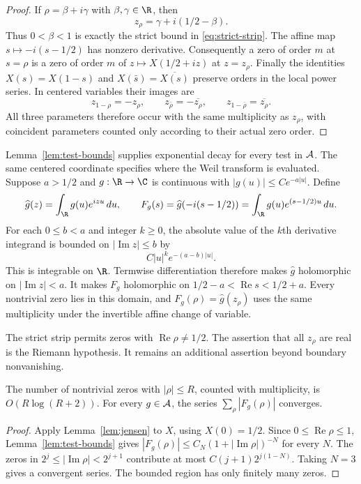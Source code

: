 \begin{proof}
If $\rho=\beta+i\gamma$ with $\beta,\gamma\in\R$, then
\[
 z_\rho=\gamma+i(1/2-\beta).
\]
Thus $0<\beta<1$ is exactly the strict bound in
\eqref{eq:strict-strip}.
The affine map $s\mapsto-i(s-1/2)$ has nonzero derivative.
Consequently a zero of order $m$ at $s=\rho$ is a zero of order $m$
of $z\mapsto X(1/2+iz)$ at $z=z_\rho$.
Finally the identities $X(s)=X(1-s)$ and
$X(\bar s)=\overline{X(s)}$ preserve orders in the local power series.
In centered variables their images are
\[
 z_{1-\rho}=-z_\rho,\qquad
 z_{\bar\rho}=-\overline{z_\rho},\qquad
 z_{1-\bar\rho}=\overline{z_\rho}.
\]
All three parameters therefore occur with the same multiplicity as
$z_\rho$, with coincident parameters counted only according to their
actual zero order.
\end{proof}

Lemma~\ref{lem:test-bounds} supplies exponential decay for every test in $\mathcal A$.
The same centered coordinate specifies where the Weil transform is
evaluated.  Suppose $a>1/2$ and $g:\R\to\C$ is continuous with
$|g(u)|\leq C e^{-a|u|}$.
Define
\[
 \widehat g(z)=\int_{\R}g(u)e^{izu}\,du,
 \qquad
 F_g(s)=\widehat g(-i(s-1/2))
       =\int_{\R}g(u)e^{(s-1/2)u}\,du.
\]
For each $0\leq b<a$ and integer $k\geq0$, the absolute value of the
$k$th derivative integrand is bounded on $|\operatorname{Im}z|\leq b$ by
\[
 C|u|^k e^{-(a-b)|u|}.
\]
This is integrable on $\R$.
Termwise differentiation therefore makes $\widehat g$ holomorphic on
$|\operatorname{Im}z|<a$.
It makes $F_g$ holomorphic on
$1/2-a<\operatorname{Re}s<1/2+a$.
Every nontrivial zero lies in this domain, and
$F_g(\rho)=\widehat g(z_\rho)$ uses the same multiplicity under the
invertible affine change of variable.

The strict strip permits zeros with $\operatorname{Re}\rho\ne1/2$.
The assertion that all $z_\rho$ are real is the Riemann hypothesis.
It remains an additional assertion beyond boundary nonvanishing.

\begin{corollary}
\label{cor:zero-count}
The number of nontrivial zeros with $|\rho|\leq R$, counted with multiplicity,
is $O(R\log(R+2))$.
For every $g\in\mathcal A$, the series $\sum_\rho|F_g(\rho)|$ converges.
\end{corollary}

\begin{proof}
Apply Lemma~\ref{lem:jensen} to $X$, using $X(0)=1/2$.
Since $0\leq\operatorname{Re}\rho\leq1$, Lemma~\ref{lem:test-bounds}
gives $|F_g(\rho)|\leq C_N(1+|\operatorname{Im}\rho|)^{-N}$ for every $N$.
The zeros in $2^j\leq|\operatorname{Im}\rho|<2^{j+1}$ contribute at most
$C(j+1)2^{j(1-N)}$.  Taking $N=3$ gives a convergent series.
The bounded region has only finitely many zeros.
\end{proof}

